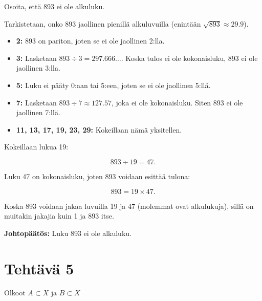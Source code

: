 \documentclass{article}
\begin{document}
Osoita, että 893 ei ole alkuluku.

\begin{flushleft}
Tarkistetaan, onko 893 jaollinen pienillä alkuluvuilla (enintään \( \sqrt{893} \approx 29.9 \)).
\end{flushleft}

\begin{itemize}
	\item \textbf{2:} 893 on pariton, joten se ei ole jaollinen 2:lla.
	\item \textbf{3:} Lasketaan \(893 \div 3 = 297.666\ldots\). Koska tulos ei ole kokonaisluku, 893 ei ole jaollinen 3:lla.
	\item \textbf{5:} Luku ei pääty 0:aan tai 5:een, joten se ei ole jaollinen 5:llä.
	\item \textbf{7:} Lasketaan \(893 \div 7 \approx 127.57\), joka ei ole kokonaisluku. Siten 893 ei ole jaollinen 7:llä.
	\item \textbf{11, 13, 17, 19, 23, 29:} Kokeillaan nämä yksitellen.
\end{itemize}

\begin{flushleft}
Kokeillaan lukua 19:
\end{flushleft}
\[
893 \div 19 = 47.
\]

\begin{flushleft}
Luku 47 on kokonaisluku, joten 893 voidaan esittää tulona:
\end{flushleft}
\[
893 = 19 \times 47.
\]

\begin{flushleft}
Koska 893 voidaan jakaa luvuilla 19 ja 47 (molemmat ovat alkulukuja), sillä on muitakin jakajia kuin 1 ja 893 itse.
\end{flushleft}

\begin{flushleft}
\textbf{Johtopäätös:} Luku 893 ei ole alkuluku.
\end{flushleft}


\newpage

\section*{Tehtävä 5}

Olkoot \(A \subset X \text{ ja } B \subset X\)
\end{document}
